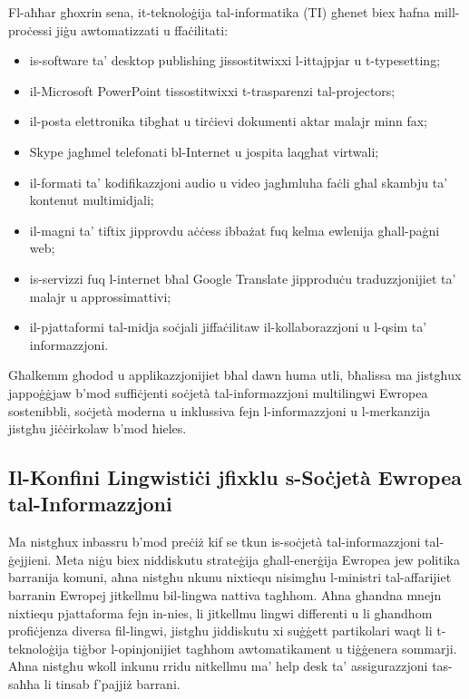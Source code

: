 \documentclass[]{../../metanetpaper}
\begin{document}
\begin{multicols}{2}
Fl-aħħar għoxrin sena, it-teknoloġija tal-informatika (TI) għenet biex ħafna mill-proċessi jiġu awtomatizzati u ffaċilitati:

\begin{itemize}
\item is-software ta’ desktop publishing jissostitwixxi l-ittajpjar u t-typesetting;
\item il-Microsoft PowerPoint tissostitwixxi t-trasparenzi tal-projectors;
\item il-posta elettronika tibgħat u tirċievi dokumenti aktar malajr minn fax;
\item Skype jagħmel telefonati bl-Internet u jospita laqgħat virtwali;
\item il-formati ta’ kodifikazzjoni audio u video jagħmluha faċli għal skambju ta’ kontenut multimidjali; 
\item il-magni ta’ tiftix jipprovdu aċċess ibbażat fuq kelma ewlenija għall-paġni web;
\item is-servizzi fuq l-internet bħal Google Translate jipproduċu traduzzjonijiet ta’ malajr u approssimattivi;
\item il-pjattaformi tal-midja soċjali jiffaċilitaw il-kollaborazzjoni u l-qsim ta’ informazzjoni. 
\end{itemize}

Għalkemm għodod u applikazzjonijiet bħal dawn huma utli, bħalissa ma jistgħux jappoġġjaw b'mod suffiċjenti soċjetà tal-informazzjoni multilingwi Ewropea sostenibbli, soċjetà moderna u inklussiva fejn l-informazzjoni u l-merkanzija jistgħu jiċċirkolaw b’mod ħieles.

\subsection{Il-Konfini Lingwistiċi jfixklu s-Soċjetà Ewropea tal-Informazzjoni}
  
Ma nistgħux inbassru b’mod preċiż kif se tkun is-soċjetà tal-informazzjoni tal-ġejjieni. Meta niġu biex niddiskutu strateġija għall-enerġija Ewropea jew politika barranija komuni, aħna nistgħu nkunu nixtiequ nisimgħu l-ministri tal-affarijiet barranin Ewropej jitkellmu bil-lingwa nattiva tagħhom. Aħna għandna mnejn nixtiequ pjattaforma fejn in-nies, li jitkellmu lingwi differenti u li għandhom profiċjenza diversa fil-lingwi, jistgħu jiddiskutu xi suġġett partikolari waqt li t-teknoloġija tiġbor l-opinjonijiet tagħhom awtomatikament u tiġġenera sommarji. Aħna nistgħu wkoll inkunu rridu nitkellmu ma’ help desk ta’ assigurazzjoni tas-saħħa li tinsab f’pajjiż barrani.


\end{multicols}
\end{document}
